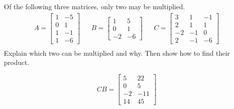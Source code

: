 
\begin{exerciseStatement}


Of the following three matrices, only two may be multiplied. 
\begin{align*} A= \left[\begin{array}{cc}
1 & -5 \\
0 & 1 \\
1 & -1 \\
1 & -6
\end{array}\right]  & & B= \left[\begin{array}{cc}
1 & 5 \\
0 & 1 \\
-2 & -6
\end{array}\right]  & & C= \left[\begin{array}{ccc}
3 & 1 & -1 \\
2 & 1 & 1 \\
-2 & -1 & 0 \\
2 & -1 & -6
\end{array}\right]  \\ \end{align*}
             Explain which two can be multiplied and why. Then show how to find their product.


\end{exerciseStatement}
    
\begin{exerciseAnswer} 
\[CB= \left[\begin{array}{cc}
5 & 22 \\
0 & 5 \\
-2 & -11 \\
14 & 45
\end{array}\right] \]
\end{exerciseAnswer}
    
